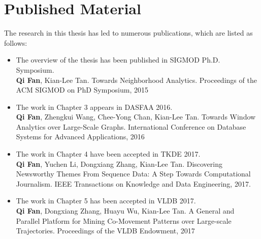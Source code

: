 \section{Published Material}
The research in this thesis has led to numerous publications, which are listed as follows: 

\begin{itemize}
	\item{The overview of the thesis has been published in SIGMOD Ph.D. Symposium.\\
		\textbf{Qi Fan}, Kian-Lee Tan. Towards Neighborhood Analytics. Proceedings of the ACM SIGMOD on PhD Symposium, 2015
	}
	\item{The work in Chapter 3 appears in DASFAA 2016.\\
		\textbf{Qi Fan}, Zhengkui Wang, Chee-Yong Chan, Kian-Lee Tan. Towards Window Analytics over Large-Scale Graphs. International Conference on Database Systems for Advanced Applications, 2016
	}
	\item{The work in Chapter 4 have been accepted in TKDE 2017.\\
		\textbf{Qi Fan}, Yuchen Li, Dongxiang Zhang, Kian-Lee Tan. Discovering Newsworthy Themes From Sequence Data: A Step Towards Computational Journalism.  IEEE Transactions on Knowledge and Data Engineering, 2017.
	}
	\item{The work in Chapter 5 has been accepted in VLDB 2017.\\
		\textbf{Qi Fan}, Dongxiang Zhang, Huayu Wu, Kian-Lee Tan. A General and Parallel Platform for Mining Co-Movement Patterns over Large-scale Trajectories. Proceedings of the VLDB Endowment, 2017
	}	
\end{itemize}

%
%
%
%
%
%
